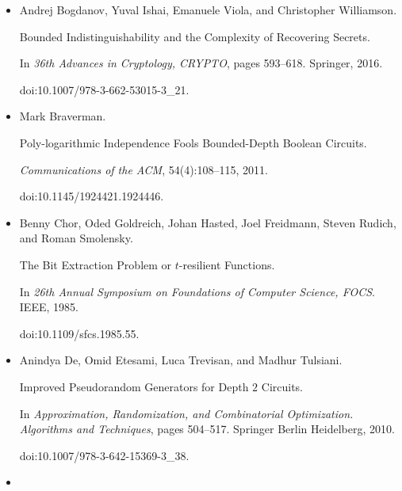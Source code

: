 \begin{itemize}
doi:10.4230/LIPIcs.ITCS.2022.26.





\item[] 
[6]

Andrej Bogdanov, Yuval Ishai, Emanuele Viola, and Christopher Williamson.


Bounded Indistinguishability and the Complexity of Recovering
Secrets.


In \emph{36th Advances in Cryptology, CRYPTO}, pages 593–618.
Springer, 2016.


doi:10.1007/978-3-662-53015-3\_21.





\item[] 
[7]

Mark Braverman.


Poly-logarithmic Independence Fools Bounded-Depth Boolean Circuits.


\emph{Communications of the ACM}, 54(4):108–115, 2011.


doi:10.1145/1924421.1924446.





\item[] 
[8]

Benny Chor, Oded Goldreich, Johan Hasted, Joel Freidmann, Steven Rudich, and
Roman Smolensky.


The Bit Extraction Problem or $t$-resilient Functions.


In \emph{26th Annual Symposium on Foundations of Computer Science,
FOCS}. IEEE, 1985.


doi:10.1109/sfcs.1985.55.





\item[] 
[9]

Anindya De, Omid Etesami, Luca Trevisan, and Madhur Tulsiani.


Improved Pseudorandom Generators for Depth $2$ Circuits.


In \emph{Approximation, Randomization, and Combinatorial Optimization.
Algorithms and Techniques}, pages 504–517. Springer Berlin Heidelberg, 2010.


doi:10.1007/978-3-642-15369-3\_38.





\item[] 
[10]


\end{itemize}
